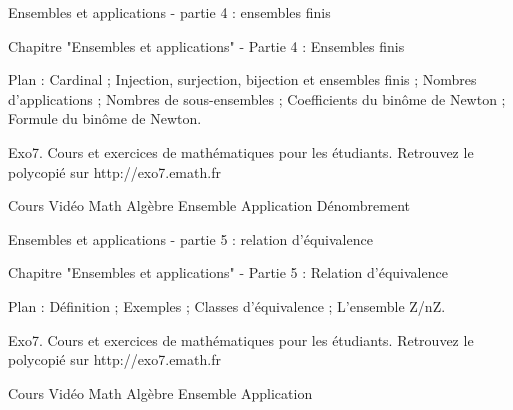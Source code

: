 

Ensembles et applications - partie 4 : ensembles finis

Chapitre "Ensembles et applications" - Partie 4 : Ensembles finis

Plan : Cardinal ; Injection, surjection, bijection et ensembles finis ; 
Nombres d'applications ; Nombres de sous-ensembles ; Coefficients du binôme de Newton ;
Formule du binôme de Newton.

Exo7. Cours et exercices de mathématiques pour les étudiants.
Retrouvez le polycopié sur http://exo7.emath.fr


Cours Vidéo Math Algèbre Ensemble Application Dénombrement




Ensembles et applications - partie 5 : relation d'équivalence

Chapitre "Ensembles et applications" - Partie 5 : Relation d'équivalence

Plan : Définition ; Exemples ; Classes d'équivalence ; 
L'ensemble Z/nZ.

Exo7. Cours et exercices de mathématiques pour les étudiants.
Retrouvez le polycopié sur http://exo7.emath.fr


Cours Vidéo Math Algèbre Ensemble Application

